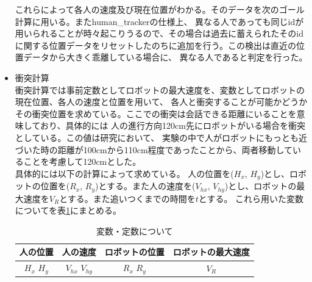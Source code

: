 \documentclass{kuisthesis}
\begin{document}
\begin{itemize}
\quad これらによって各人の速度及び現在位置がわかる。そのデータを次のゴール計算に用いる。またhuman\_trackerの仕様上、
異なる人であっても同じidが用いられることが時々起こりうるので、その場合は過去に蓄えられたそのidに関する位置データをリセットしたのちに追加を行う。この検出は直近の位置データから大きく乖離している場合に、
異なる人であると判定を行った。
  \item 衝突計算 \\
  \quad 衝突計算では事前定数としてロボットの最大速度を、変数としてロボットの現在位置、各人の速度と位置を用いて、
各人と衝突することが可能かどうかその衝突位置を求めている。ここでの衝突は会話できる距離にいることを意味しており、具体的には
人の進行方向120cm先にロボットがいる場合を衝突としている。この値は研究\cite{mumm2011human}において、
実験の中で人がロボットにもっとも近づいた時の距離が100cmから110cm程度であったことから、両者移動していることを考慮して120cmとした。\\
\quad 具体的には以下の計算によって求めている。
人の位置を($H_x$, $H_y$)とし、ロボットの位置を($R_x$, $R_y$)とする。また人の速度を($V_{hx}$, $V_{hy}$)とし、ロボットの最大速度を$V_R$とする。また追いつくまでの時間を$t$とする。
これら用いた変数についてを表\ref{fig: variable}にまとめる。
\begin{table}[H]
  \centering
  \caption{変数・定数について}
  \label{fig: variable}
  \begin{tabular}{|c|c|c|c|}
    \hline
    人の位置 & 人の速度 & ロボットの位置 & ロボットの最大速度 \\ \hline
    $H_x$  $H_y$ & $V_{hx}$  $V_{hy}$ & $R_x$  $R_y$ & $V_R$ \\ \hline
  \end{tabular}
  

\end{table}
\end{itemize}
\end{document}
